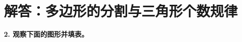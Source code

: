 \newpage



\section{解答：多边形的分割与三角形个数规律}

\vspace{0.4cm}

\noindent\textbf{2. 观察下面的图形并填表。}

\vspace{0.8cm}

%
%

